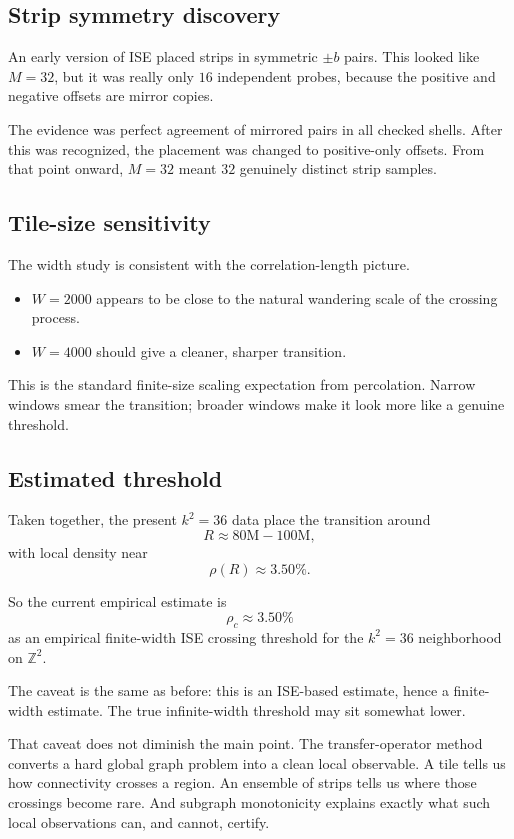\documentclass[12pt,letterpaper]{article}
\theoremstyle{definition}
\theoremstyle{remark}
\begin{document}
\subsection{Strip symmetry discovery}

An early version of ISE placed strips in symmetric $\pm b$ pairs. This looked like $M=32$, but it was really only $16$ independent probes, because the positive and negative offsets are mirror copies.

The evidence was perfect agreement of mirrored pairs in all checked shells. After this was recognized, the placement was changed to positive-only offsets. From that point onward, $M=32$ meant $32$ genuinely distinct strip samples.

\subsection{Tile-size sensitivity}

The width study is consistent with the correlation-length picture.

\begin{itemize}
\item $W=2000$ appears to be close to the natural wandering scale of the crossing process.
\item $W=4000$ should give a cleaner, sharper transition.
\end{itemize}

This is the standard finite-size scaling expectation from percolation. Narrow windows smear the transition; broader windows make it look more like a genuine threshold.

\subsection{Estimated threshold}

Taken together, the present $k^2=36$ data place the transition around
\[
R\approx 80\text{M}-100\text{M},
\]
with local density near
\[
\rho(R)\approx 3.50\%.
\]

So the current empirical estimate is
\[
\rho_c \approx 3.50\%
\]
as an empirical finite-width ISE crossing threshold for the $k^2=36$ neighborhood on $\mathbb{Z}^2$.

The caveat is the same as before: this is an ISE-based estimate, hence a finite-width estimate. The true infinite-width threshold may sit somewhat lower.

That caveat does not diminish the main point. The transfer-operator method converts a hard global graph problem into a clean local observable. A tile tells us how connectivity crosses a region. An ensemble of strips tells us where those crossings become rare. And subgraph monotonicity explains exactly what such local observations can, and cannot, certify.
\end{document}
